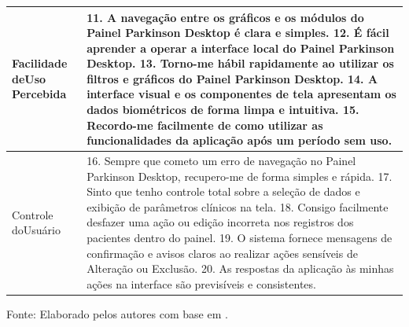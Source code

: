 \begin{quadro}[H]
\begin{tabular}{|p{4cm}|p{10.5cm}|}
    Facilidade de\newline Uso Percebida 
    & 11. A navegação entre os gráficos e os módulos do Painel Parkinson Desktop é clara e simples. \newline \vspace{0.15cm}
    12. É fácil aprender a operar a interface local do Painel Parkinson Desktop. \newline \vspace{0.15cm}
    13. Torno-me hábil rapidamente ao utilizar os filtros e gráficos do Painel Parkinson Desktop. \newline \vspace{0.15cm}
    14. A interface visual e os componentes de tela apresentam os dados biométricos de forma limpa e intuitiva. \newline \vspace{0.15cm}
    15. Recordo-me facilmente de como utilizar as funcionalidades da aplicação após um período sem uso. \\ \hline

    Controle do\newline Usuário
    & 16. Sempre que cometo um erro de navegação no Painel Parkinson Desktop, recupero-me de forma simples e rápida. \newline \vspace{0.15cm}
    17. Sinto que tenho controle total sobre a seleção de dados e exibição de parâmetros clínicos na tela. \newline \vspace{0.15cm}
    18. Consigo facilmente desfazer uma ação ou edição incorreta nos registros dos pacientes dentro do painel. \newline \vspace{0.15cm}
    19. O sistema fornece mensagens de confirmação e avisos claros ao realizar ações sensíveis de Alteração ou Exclusão. \newline \vspace{0.15cm}
    20. As respostas da aplicação às minhas ações na interface são previsíveis e consistentes. \\ \hline
    \end{tabular}
    
    \vspace{0.2cm}
    \centerline{\footnotesize Fonte: Elaborado pelos autores com base em \cite{RussJara2025, Tejeda2024}.}
\end{quadro}

\newpage %

